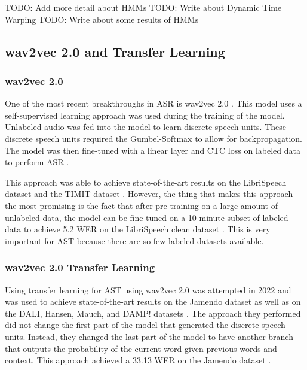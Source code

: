 \documentclass[letterpaper, 12pt]{article}
\begin{document}
\begin{multicols*}{2}
{
\color{red}
TODO: Add more detail about HMMs
TODO: Write about Dynamic Time Warping
TODO: Write about some results of HMMs
}


\subsection{wav2vec 2.0 and Transfer Learning} \label{sec:wav2vec}

\subsubsection{wav2vec 2.0}
One of the most recent breakthroughs in ASR is wav2vec 2.0 \cite{wav2vec}. This model uses a
self-supervised learning approach was used during the training of the model. Unlabeled audio was
fed into the model to learn discrete speech units. These discrete speech units required the
Gumbel-Softmax \cite{gumbelSoftmax} to allow for backpropagation. The model was then
fine-tuned with a linear layer and CTC loss on labeled data to perform ASR \cite{wav2vec}.

This approach was able to achieve state-of-the-art results on the LibriSpeech dataset \cite{Librispeech}
and the TIMIT dataset \cite{TIMIT}. However, the thing that makes this approach the most promising
is the fact that after pre-training on a large amount of unlabeled data, the model can be fine-tuned
on a 10 minute subset of labeled data to achieve 5.2 WER on the LibriSpeech clean dataset \cite{wav2vec}.
This is very important for AST because there are so few labeled datasets available.

\subsubsection{wav2vec 2.0 Transfer Learning}
Using transfer learning for AST using wav2vec 2.0 was attempted in 2022 and was used to achieve
state-of-the-art results on the Jamendo dataset as well as on the DALI, Hansen, Mauch,
and DAMP! datasets \cite{wav2vecTransfer}. The approach they performed did not change the first part
of the model that generated the discrete speech units. Instead, they changed the last part of the
model to have another branch that outputs the probability of the current word given previous words
and context. This approach achieved a 33.13 WER on the Jamendo dataset \cite{wav2vecTransfer}.


\end{multicols*}
\end{document}
